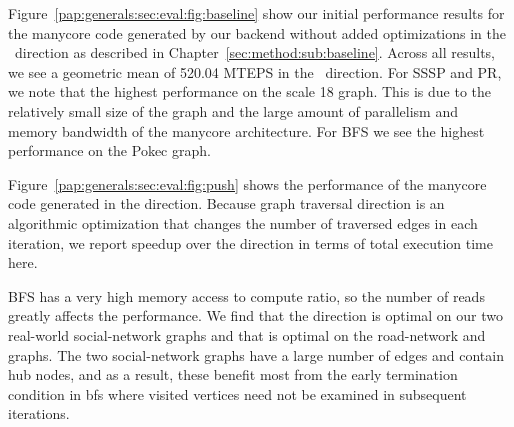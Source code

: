 Figure~\ref{pap:generals:sec:eval:fig:baseline} show our initial performance results for the manycore code generated by our backend without added optimizations in the \pull~direction as described in Chapter~\ref{sec:method:sub:baseline}.
Across all results, we see a geometric mean of 520.04 MTEPS in the \pull~direction.%
For SSSP and PR, we note that the highest performance on the \kron scale 18 graph.
This is due to the relatively small size of the graph and the large amount of parallelism and memory bandwidth of the manycore architecture.
For BFS we see the highest performance on the Pokec graph.
 
Figure~\ref{pap:generals:sec:eval:fig:push} shows the performance of the manycore code generated in the \push direction.
Because graph traversal direction is an algorithmic optimization that changes the number of traversed edges in each iteration, we report speedup over the \pull direction in terms of total execution time here.

BFS has a very high memory access to compute ratio, so the number of reads greatly affects the performance.
We find that the \pull direction is optimal on our two real-world social-network graphs and that \push is optimal on the road-network and \kron graphs.
The two social-network graphs have a large number of edges and contain hub nodes, and as a result, these benefit most from the early termination condition in bfs \pull where visited vertices need not be examined in subsequent iterations.
 
